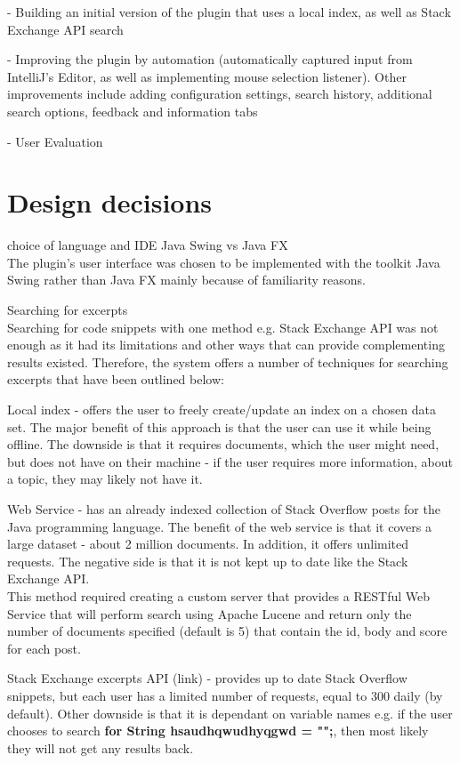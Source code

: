 \documentclass{l4proj}
\begin{document}
- Building an initial version of the plugin that uses a local index, as well as Stack Exchange API search

- Improving the plugin by automation (automatically captured input from IntelliJ's Editor, as well as implementing mouse selection listener). Other improvements include adding configuration settings, search history, additional search options, feedback and information tabs

- User Evaluation

\section{Design decisions}
choice of language and IDE
Java Swing vs Java FX\\
The plugin's user interface was chosen to be implemented with the toolkit Java Swing rather than Java FX mainly because of familiarity reasons.

Searching for excerpts\\
Searching for code snippets with one method e.g. Stack Exchange API was not enough as it had its limitations and other ways that can provide complementing results existed. Therefore, the system offers a number of techniques for searching excerpts that have been outlined below:

Local index - offers the user to freely create/update an index on a chosen data set. The major benefit of this approach is that the user can use it while being offline. The downside is that it requires documents, which the user might need, but does not have on their machine - if the user requires more information, about a topic, they may likely not have it.  

Web Service - has an already indexed collection of Stack Overflow posts for the Java programming language.  The benefit of the web service is that it covers a large dataset - about 2 million documents. In addition, it offers unlimited requests. The negative side is that it is not kept up to date like the Stack Exchange API. \\
This method required creating a custom server that provides a RESTful Web Service that will perform search using Apache Lucene and return only the number of documents specified (default is 5) that contain the id, body and score for each post. 

Stack Exchange excerpts API (link) - provides up to date Stack Overflow snippets, but each user has a limited number of requests, equal to 300 daily (by default). Other downside is that it is dependant on variable names e.g. if the user chooses to search \textbf{for String hsaudhqwudhyqgwd = "";}, then most likely they will not get any results back.
\end{document}
